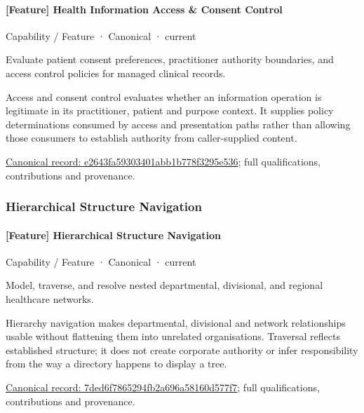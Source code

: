 \paragraph{[Feature] Health Information Access \& Consent Control}

\label{element:e2643fa59303401abb1b778f3295e536}
{\small Capability / Feature · Canonical · current}\par

Evaluate patient consent preferences, practitioner authority boundaries, and access control policies for managed clinical records.



Access and consent control evaluates whether an information operation is legitimate in its practitioner, patient and purpose context. It supplies policy determinations consumed by access and presentation paths rather than allowing those consumers to establish authority from caller-supplied content.


{\footnotesize \href{../../../../continuum/strategy/capability/feature/e2643fa59303401abb1b778f3295e536.md}{Canonical record: e2643fa59303401abb1b778f3295e536}; full qualifications, contributions and provenance.}\par
\subsubsection{Hierarchical Structure Navigation}

\paragraph{[Feature] Hierarchical Structure Navigation}

\label{element:7ded6f7865294fb2a696a58160d577f7}
{\small Capability / Feature · Canonical · current}\par

Model, traverse, and resolve nested departmental, divisional, and regional healthcare networks.



Hierarchy navigation makes departmental, divisional and network relationships usable without flattening them into unrelated organisations. Traversal reflects established structure; it does not create corporate authority or infer responsibility from the way a directory happens to display a tree.


{\footnotesize \href{../../../../continuum/strategy/capability/feature/7ded6f7865294fb2a696a58160d577f7.md}{Canonical record: 7ded6f7865294fb2a696a58160d577f7}; full qualifications, contributions and provenance.}\par
